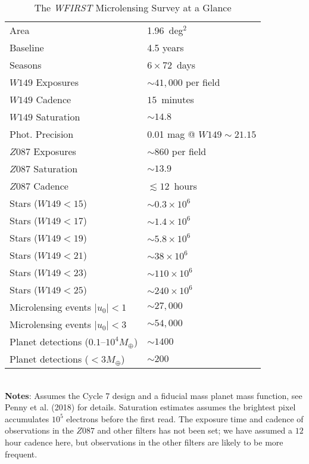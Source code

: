 \documentclass{article}
\begin{document}
\begin{table}
  \caption{The {\it WFIRST} Microlensing Survey at a Glance}
  \begin{tabular}{ll}
    \hline
    Area & 1.96~deg$^2$\\
    Baseline & 4.5 years\\
    Seasons & $6\times 72$~days\\
    $W149$ Exposures & ${\sim}41,000$ per field\\
    $W149$ Cadence & $15$~minutes\\
    $W149$ Saturation & ${\sim}14.8$\\
    Phot. Precision & 0.01 mag @ $W149{\sim}21.15$\\
    $Z087$ Exposures & ${\sim}860$ per field\\
    $Z087$ Saturation & ${\sim}13.9$\\
    $Z087$ Cadence & $\lesssim12$~hours\\
    Stars ($W149<15$) & ${\sim}0.3\times10^{6}$\\
    Stars ($W149<17$) & ${\sim}1.4\times10^{6}$\\
    Stars ($W149<19$) & ${\sim}5.8\times10^{6}$\\
    Stars ($W149<21$) & ${\sim}38\times10^{6}$\\
    Stars ($W149<23$) & ${\sim}110\times10^{6}$\\
    Stars ($W149<25$) & ${\sim}240\times10^{6}$\\
    Microlensing events $|u_0|<1$ & ${\sim}27,000$\\
    Microlensing events $|u_0|<3$ & ${\sim}54,000$\\
    Planet detections ($0.1$--$10^{4} M_{\oplus}$) & ${\sim}1400$\\
    Planet detections ($<3 M_{\oplus}$) & ${\sim}200$\\
    \hline
  \end{tabular}
      \\{\bf Notes}: Assumes the Cycle 7 design and a fiducial mass planet mass function, see Penny et al. (2018) for details. Saturation estimates assumes the brightest pixel accumulates $10^5$ electrons before the first read. The exposure time and cadence of observations in the $Z087$ and other filters has not been set; we have assumed a $12$ hour cadence here, but observations in the other filters are likely to be more frequent.
      \label{wfirstsummary}
\end{table}
\end{document}

